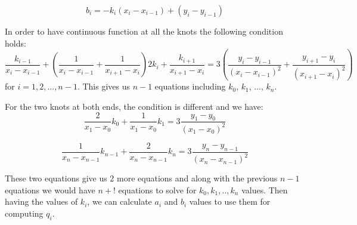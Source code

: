 \documentclass[letterpaper,12pt]{article}
\begin{document}
\begin{equation}
b_i = -k_i (x_i - x_{i-1}) + (y_i - y_{i-1})
\end{equation}

In order to have continuous function at all the knots the following condition holds:
\begin{equation}
\frac{k_{i-1}}{x_i - x_{i-1}} +    \left (    \frac{1}{x_i - x_{i-1}} + \frac{1}{x_{i+1}-x_i} \right ) 2k_i + \frac{k_{i+1}}{x_{i+1}-x_i} = 3  \left(  \frac{y_i - y_{i-1}}{(x_i - x_{i-1})^2} + \frac{y_{i+1}-y_i}{( x_{i+1}-x_i )^2} \right)
\end{equation}
for $i=1,2,...,n-1$. This gives us $n-1$ equations including $k_0$, $k_1$, ..., $k_n$.

For the two knots at both ends, the condition is different and we have:
\begin{equation}
\frac{2}{x_1-x_0}k_0 + \frac{1}{x_1-x_0}k_1 = 3\frac{y_1-y_0}{(x_1-x_0)^2}
\end{equation}


\begin{equation}
\frac{1}{x_n-x_{n-1}}k_{n-1} + \frac{2}{x_n-x_{n-1}}k_n = 3\frac{y_n-y_{n-1}}{(x_n-x_{n-1})^2}
\end{equation}

These two equations give us 2 more equations and along with the previous $n-1$ equations we would have $n+!$ equations to solve for $k_0,k_1,..,k_n$ values. Then having the values of $k_i$, we can calculate $a_i$ and $b_i$ values to use them for computing $q_i$.
\end{document}
